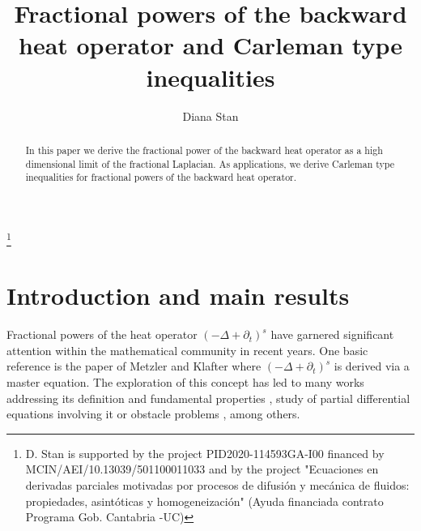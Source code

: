 \documentclass[11pt, twoside, notitlepage]{amsart}
\numberwithin{equation}{section}
\begin{document}
\title{
Fractional powers of the backward heat operator and Carleman type inequalities}

\author{Diana Stan}
\address[D. Stan]{University of Cantabria, Department of Mathematics, Statistics and Computation,
Avd. Los Castros 44, 39005 Santander, Spain}



\thanks{D. Stan is supported by the project  PID2020-114593GA-I00 financed by MCIN/AEI/10.13039/501100011033 and by the project "Ecuaciones en derivadas parciales motivadas por procesos de difusión y mecánica de fluidos: propiedades, asintóticas y homogeneización" (Ayuda financiada contrato Programa Gob. Cantabria -UC)}



\begin{abstract}
	In this paper we derive the  fractional power of the backward heat operator as a high dimensional limit of the fractional Laplacian. As applications, we  derive  Carleman type inequalities for  fractional powers of the backward heat operator.
\end{abstract}

\maketitle

\section{Introduction and main results}






Fractional powers of the heat operator  $(-\Delta+\partial_t)^s$  have garnered significant attention within the mathematical community in recent years. One basic reference is the paper of Metzler and Klafter \cite{Metzler} where $(-\Delta+\partial_t)^s$ is derived via a master equation.
The exploration of this concept has led to many works addressing its definition and fundamental properties \cite{StingaTorreaMastersEq},  study of partial differential equations involving it \cite{Audrito, Audrito-Terracini,Ferreira-DePablo} or obstacle problems \cite{Athanasopoulos}, among others.
\end{document}
